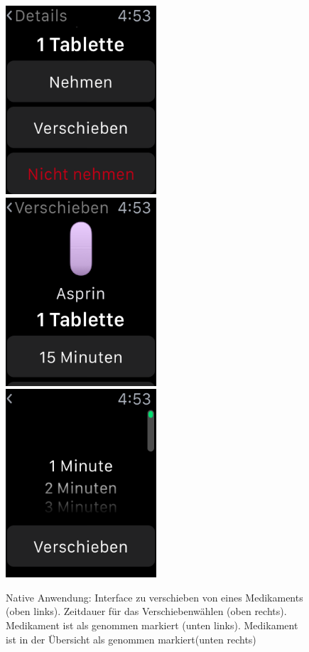 \begin{figure}
	\caption{Native Anwendung: Interface zu verschieben von eines Medikaments (oben links). Zeitdauer für das Verschiebenwählen (oben rechts). Medikament ist als genommen markiert (unten links). Medikament ist in der Übersicht als genommen markiert(unten rechts)}
	\label{fig:watch-app-delay}
	\includegraphics[width=0.5\textwidth]{04_realisation/screenshots/watch/delay01.png}
	\includegraphics[width=0.5\textwidth]{04_realisation/screenshots/watch/delay02.png}
	\includegraphics[width=0.5\textwidth]{04_realisation/screenshots/watch/delay03.png}

\end{figure}
